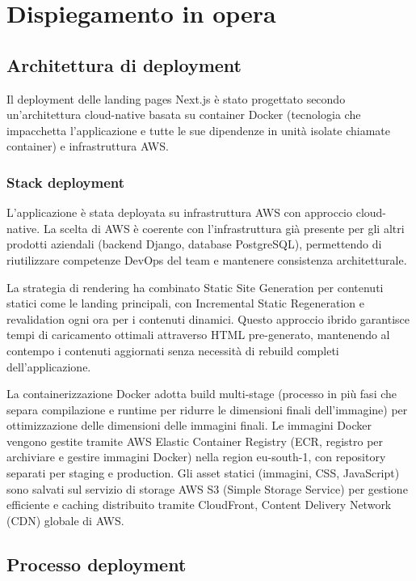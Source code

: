 \chapter{Dispiegamento in opera}

\section{Architettura di deployment}

Il deployment delle landing pages Next.js è stato progettato secondo 
un'architettura cloud-native basata su container Docker (tecnologia che 
impacchetta l'applicazione e tutte le sue dipendenze in unità isolate 
chiamate container) e infrastruttura AWS.

\subsection{Stack deployment}

L'applicazione è stata deployata su infrastruttura AWS con approccio cloud-native. 
La scelta di AWS è coerente con l'infrastruttura già presente per gli altri 
prodotti aziendali (backend Django, database PostgreSQL), permettendo di 
riutilizzare competenze DevOps del team e mantenere consistenza architetturale.

La strategia di rendering ha combinato Static Site Generation per contenuti statici 
come le landing principali, con Incremental Static Regeneration e revalidation 
ogni ora per i contenuti dinamici. Questo approccio ibrido garantisce tempi di 
caricamento ottimali attraverso HTML pre-generato, mantenendo al contempo i 
contenuti aggiornati senza necessità di rebuild completi dell'applicazione.

La containerizzazione Docker adotta build multi-stage (processo in più fasi 
che separa compilazione e runtime per ridurre le dimensioni finali dell'immagine) 
per ottimizzazione delle dimensioni delle immagini finali. Le immagini Docker 
vengono gestite tramite AWS Elastic Container Registry (ECR, registro per 
archiviare e gestire immagini Docker) nella region eu-south-1, con repository 
separati per staging e production. Gli asset statici (immagini, CSS, JavaScript) 
sono salvati sul servizio di storage AWS S3 (Simple Storage Service) per 
gestione efficiente e caching distribuito tramite CloudFront, Content Delivery 
Network (CDN) globale di AWS.

\section{Processo deployment}

